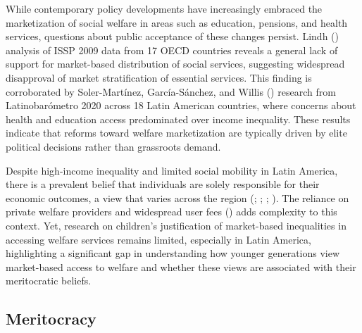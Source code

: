 \documentclass[
  letterpaper,
  DIV=11,
  numbers=noendperiod]{scrartcl}
\begin{document}
While contemporary policy developments have increasingly embraced the
marketization of social welfare in areas such as education, pensions,
and health services, questions about public acceptance of these changes
persist. Lindh () analysis of ISSP
2009 data from 17 OECD countries reveals a general lack of support for
market-based distribution of social services, suggesting widespread
disapproval of market stratification of essential services. This finding
is corroborated by Soler-Martínez, García-Sánchez, and Willis
() research from
Latinobarómetro 2020 across 18 Latin American countries, where concerns
about health and education access predominated over income inequality.
These results indicate that reforms toward welfare marketization are
typically driven by elite political decisions rather than grassroots
demand.

Despite high-income inequality and limited social mobility in Latin
America, there is a prevalent belief that individuals are solely
responsible for their economic outcomes, a view that varies across the
region (;
;
;
). The
reliance on private welfare providers and widespread user fees
() adds complexity
to this context. Yet, research on children's justification of
market-based inequalities in accessing welfare services remains limited,
especially in Latin America, highlighting a significant gap in
understanding how younger generations view market-based access to
welfare and whether these views are associated with their meritocratic
beliefs.

\subsection{Meritocracy}\label{meritocracy}
\end{document}
